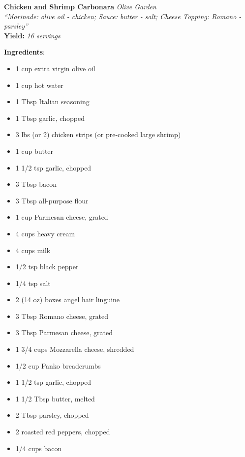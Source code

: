 \documentclass[11pt, twoside, openany]{book}
\begin{document}
\noindent\begin{minipage}[t]{\linewidth}%
{\Large\textbf{Chicken and Shrimp Carbonara}} \label{chicken-and-shrimp-carbonara}\hfill\textit{Olive Garden}\\
\textit{``Marinade: olive oil - chicken; Sauce: butter - salt; Cheese Topping: Romano - parsley''}\\
\textbf{Yield:} \textit{16 servings}\\
\noindent\begin{minipage}[t]{0.78\linewidth}%
\textbf{Ingredients}:\vspace{-3mm}
\begin{multicols}{2}
\begin{itemize}\setlength\itemsep{-1mm}
\item 1 cup extra virgin olive oil
\item 1 cup hot water
\item 1 Tbsp Italian seasoning
\item 1 Tbsp garlic, chopped
\item 3 lbs (or 2) chicken strips (or pre-cooked large shrimp)
\item 1 cup butter
\item 1 1/2 tsp garlic, chopped
\item 3 Tbsp bacon
\item 3 Tbsp all-purpose flour
\item 1 cup Parmesan cheese, grated
\item 4 cups heavy cream
\item 4 cups milk
\item 1/2 tsp black pepper
\item 1/4 tsp salt
\item 2 (14 oz) boxes angel hair linguine
\item 3 Tbsp Romano cheese, grated
\item 3 Tbsp Parmesan cheese, grated
\item 1 3/4 cups Mozzarella cheese, shredded
\item 1/2 cup Panko breadcrumbs
\item 1 1/2 tsp garlic, chopped
\item 1 1/2 Tbsp butter, melted
\item 2 Tbsp parsley, chopped
\item 2 roasted red peppers, chopped
\item 1/4 cups bacon
\end{itemize}
\end{multicols}
\end{minipage}

\end{minipage}
\end{document}
